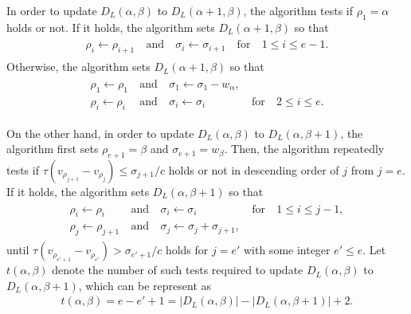\documentclass[a4paper]{llncs}
\begin{document}
In order to update $D_L(\alpha, \beta)$ to $D_L(\alpha+1, \beta)$, the algorithm tests if $\rho_1 = \alpha$ holds or not. 
If it holds, the algorithm sets $D_L(\alpha+1, \beta)$ so that
\begin{eqnarray}
    \begin{array}{lllll}
	\rho_i \leftarrow \rho_{i+1} \	& \mbox{and} \ & \sigma_i \leftarrow \sigma_{i+1} \				& \mbox{for} \ & 1 \le i \le e-1.
    \end{array}
    \label{eq15}
\end{eqnarray}
Otherwise, the algorithm sets $D_L(\alpha+1, \beta)$ so that
\begin{eqnarray}
    \begin{array}{lllll}
    	\rho_1 \leftarrow \rho_1 \	& \mbox{and} \ & \sigma_1 \leftarrow \sigma_1 - w_\alpha, \		& \\
	\rho_i \leftarrow \rho_i \	& \mbox{and} \ & \sigma_i \leftarrow \sigma_i \				& \mbox{for} \ & 2 \le i \le e.
    \end{array}
    \label{eq16}
\end{eqnarray}

On the other hand, in order to update $D_L(\alpha, \beta)$ to $D_L(\alpha, \beta+1)$, the algorithm first sets $\rho_{e+1} = \beta$ and $\sigma_{e+1} = w_\beta$.
Then, the algorithm repeatedly tests if $\tau(v_{\rho_{j+1}}-v_{\rho_j}) \le \sigma_{j+1}/c$ holds or not in descending order of $j$ from $j = e$.
If it holds, the algorithm sets $D_L(\alpha, \beta+1)$ so that
\begin{eqnarray}
    \begin{array}{lllll}
	\rho_i \leftarrow \rho_i \		& \mbox{and} \ & \sigma_i \leftarrow \sigma_i \					& \mbox{for} \ & 1 \le i \le j-1, \\
	\rho_j \leftarrow \rho_{j+1} \	& \mbox{and} \ & \sigma_j \leftarrow \sigma_j + \sigma_{j+1}, \	& 	
    \end{array}
    \label{eq17}
\end{eqnarray}
until $\tau(v_{\rho_{e'+1}}-v_{\rho_{e'}}) > \sigma_{e'+1}/c$ holds for $j = e'$ with some integer $e' \le e$.
Let $t(\alpha, \beta)$ denote the number of such tests required to update $D_L(\alpha, \beta)$ to $D_L(\alpha, \beta+1)$, which can be represent as
\begin{eqnarray}
t(\alpha, \beta) = e - e' + 1 = |D_L(\alpha, \beta)| - |D_L(\alpha, \beta+1)| + 2.
\label{eq18}
\end{eqnarray}
\end{document}
